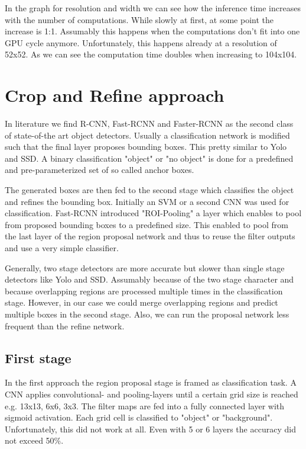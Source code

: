 \documentclass{article}
\begin{document}
In the graph for resolution and width we can see how the inference time increases with the number of computations. While slowly at first, at some point the increase is 1:1. Assumably this happens when the computations don't fit into one GPU cycle anymore. Unfortunately, this happens already at a resolution of 52x52. As we can see the computation time doubles when increasing to 104x104.
\newpage
\section{Crop and Refine approach}

In literature we find R-CNN, Fast-RCNN and Faster-RCNN as the second class of state-of-the art object detectors. Usually a classification network is modified such that the final layer proposes bounding boxes. This pretty similar to Yolo and SSD. A binary classification "object" or "no object" is done for a predefined and pre-parameterized set of so called anchor boxes.

The generated boxes are then fed to the second stage which classifies the object and refines the bounding box.
Initially an SVM or a second CNN was used for classification. Fast-RCNN introduced "ROI-Pooling" a layer which enables to pool from proposed bounding boxes to a predefined size. This enabled to pool from the last layer of the region proposal network and thus to reuse the filter outputs and use a very simple classifier. 

Generally, two stage detectors are more accurate but slower than single stage detectors like Yolo and SSD. Assumably because of the two stage character and because overlapping regions are processed multiple times in the classification stage. However, in our case we could merge overlapping regions and predict multiple boxes in the second stage. Also, we can run the proposal network less frequent than the refine network.

\subsection{ First stage}


In the first approach the region proposal stage is framed as classification task. A CNN applies convolutional- and pooling-layers until a certain grid size is reached e.g. 13x13, 6x6, 3x3. The filter maps are fed into a fully connected layer with sigmoid activation. Each grid cell is classified to "object" or "background". Unfortunately, this did not work at all. Even with 5 or 6 layers the accuracy did not exceed 50\%.
\end{document}
